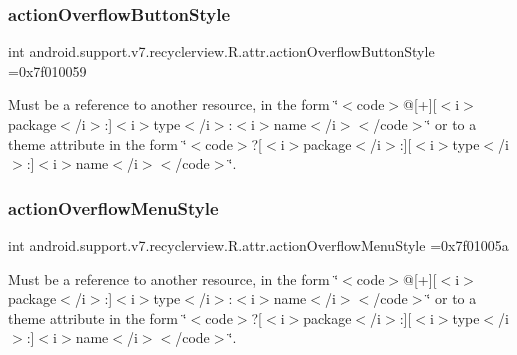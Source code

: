 \subsubsection{\texorpdfstring{action\+Overflow\+Button\+Style}{actionOverflowButtonStyle}}
{\footnotesize\ttfamily int android.\+support.\+v7.\+recyclerview.\+R.\+attr.\+action\+Overflow\+Button\+Style =0x7f010059\hspace{0.3cm}{\ttfamily [static]}}

Must be a reference to another resource, in the form \char`\"{}$<$code$>$@\mbox{[}+\mbox{]}\mbox{[}$<$i$>$package$<$/i$>$\+:\mbox{]}$<$i$>$type$<$/i$>$\+:$<$i$>$name$<$/i$>$$<$/code$>$\char`\"{} or to a theme attribute in the form \char`\"{}$<$code$>$?\mbox{[}$<$i$>$package$<$/i$>$\+:\mbox{]}\mbox{[}$<$i$>$type$<$/i$>$\+:\mbox{]}$<$i$>$name$<$/i$>$$<$/code$>$\char`\"{}. \mbox{\label{classandroid_1_1support_1_1v7_1_1recyclerview_1_1R_1_1attr_a86b5542ff55f7c7d63ead1b8dfc42247}} 
\subsubsection{\texorpdfstring{action\+Overflow\+Menu\+Style}{actionOverflowMenuStyle}}
{\footnotesize\ttfamily int android.\+support.\+v7.\+recyclerview.\+R.\+attr.\+action\+Overflow\+Menu\+Style =0x7f01005a\hspace{0.3cm}{\ttfamily [static]}}

Must be a reference to another resource, in the form \char`\"{}$<$code$>$@\mbox{[}+\mbox{]}\mbox{[}$<$i$>$package$<$/i$>$\+:\mbox{]}$<$i$>$type$<$/i$>$\+:$<$i$>$name$<$/i$>$$<$/code$>$\char`\"{} or to a theme attribute in the form \char`\"{}$<$code$>$?\mbox{[}$<$i$>$package$<$/i$>$\+:\mbox{]}\mbox{[}$<$i$>$type$<$/i$>$\+:\mbox{]}$<$i$>$name$<$/i$>$$<$/code$>$\char`\"{}. \mbox{\label{classandroid_1_1support_1_1v7_1_1recyclerview_1_1R_1_1attr_a2ab2b609338e80b8e0e4b4cc9f85bc49}} 

